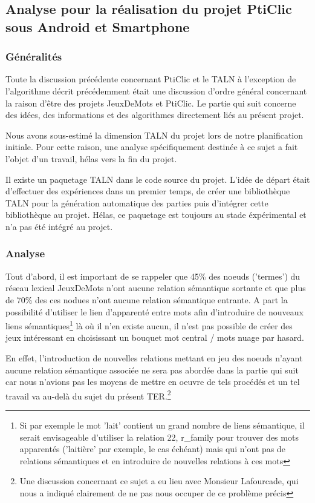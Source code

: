 \documentclass[a4paper,11pt,french]{article}
\begin{document}
\subsection{Analyse pour la réalisation du projet PtiClic sous Android et Smartphone}

\subsubsection{Généralités}

Toute la discussion précédente concernant PtiClic et le TALN à l'exception de l'algorithme décrit précédemment était une discussion d'ordre général concernant la raison d'être des projets JeuxDeMots et PtiClic. Le partie qui suit concerne des idées, des informations et des algorithmes directement liés au présent projet.

Nous avons sous-estimé la dimension TALN du projet lors de notre planification initiale. Pour cette raison, une analyse spécifiquement destinée à ce sujet a fait l'objet d'un travail, hélas vers la fin du projet. 

Il existe un paquetage TALN dans le code source du projet. L'idée de départ était d'effectuer des expériences dans un premier temps, de créer une bibliothèque TALN pour la génération automatique des parties puis d'intégrer cette bibliothèque au projet. Hélas, ce paquetage est toujours au stade éxpérimental et n'a pas été intégré au projet.   

\subsubsection{Analyse}

Tout d'abord, il est important de se rappeler que 45\% des noeuds ('termes') du réseau lexical JeuxDeMots n'ont aucune relation sémantique sortante et que plus de 70\% des ces nodues n'ont aucune relation sémantique entrante. A part la possibilité d'utiliser le lien d'apparenté entre mots afin d'introduire de nouveaux liens sémantiques\footnote{Si par exemple le mot 'lait' contient un grand nombre de liens sémantique, il serait envisageable d'utiliser la relation 22, r\_family pour trouver des mots apparentés ('laitière' par exemple, le cas échéant) mais qui n'ont pas de relations sémantiques et en introduire de nouvelles relations à ces mots} là où il n'en existe aucun, il n'est pas possible de créer des jeux intéressant en choisissant un bouquet mot central / mots nuage par hasard. 

En effet, l'introduction de nouvelles relations mettant en jeu des noeuds n'ayant aucune relation sémantique associée ne sera pas abordée dans la partie qui suit car nous n'avions pas les moyens de mettre en oeuvre de tels procédés et un tel travail va au-delà du sujet du présent TER.\footnote{Une discussion concernant ce sujet a eu lieu avec Monsieur Lafourcade, qui nous a indiqué clairement de ne pas nous occuper de ce problème précis}  
\end{document}
